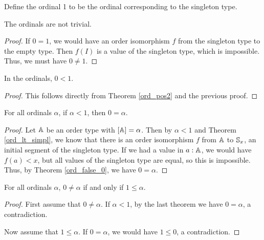 \documentclass[../../math.tex]{subfiles}
\begin{document}
\begin{instance}
    Define the ordinal 1 to be the ordinal corresponding to the singleton type.
\end{instance}

\begin{instance} \label{ord_not_trivial}
    The ordinals are not trivial.
\end{instance}
\begin{proof}
    If $0 = 1$, we would have an order isomorphism $f$ from the singleton type
    to the empty type.  Then $f(I)$ is a value of the singleton type, which is
    impossible.  Thus, we must have $0 \neq 1$.
\end{proof}

\begin{theorem} \label{ord_one_pos}
    In the ordinals, $0 < 1$.
\end{theorem}
\begin{proof}
    This follows directly from Theorem \ref{ord_pos2} and the previous proof.
\end{proof}

\begin{theorem} \label{ord_lt_one_eq}
    For all ordinals $\alpha$, if $\alpha < 1$, then $0 = \alpha$.
\end{theorem}
\begin{proof}
    Let $\A$ be an order type with $[\A] = \alpha$.  Then by $\alpha < 1$ and
    Theorem \ref{ord_lt_simpl}, we know that there is an order isomorphism $f$
    from $\A$ to $\S_x$, an initial segment of the singleton type.  If we had a
    value in $a : \A$, we would have $f(a) < x$, but all values of the singleton
    type are equal, so this is impossible.  Thus, by Theorem \ref{ord_false_0},
    we have $0 = \alpha$.
\end{proof}

\begin{theorem} \label{ord_pos_one}
    For all ordinals $\alpha$, $0 \neq \alpha$ if and only if $1 \leq \alpha$.
\end{theorem}
\begin{proof}
    First assume that $0 \neq \alpha$.  If $\alpha < 1$, by the last theorem we
    have $0 = \alpha$, a contradiction.

    Now assume that $1 \leq \alpha$.  If $0 = \alpha$, we would have $1 \leq 0$,
    a contradiction.
\end{proof}
\end{document}
